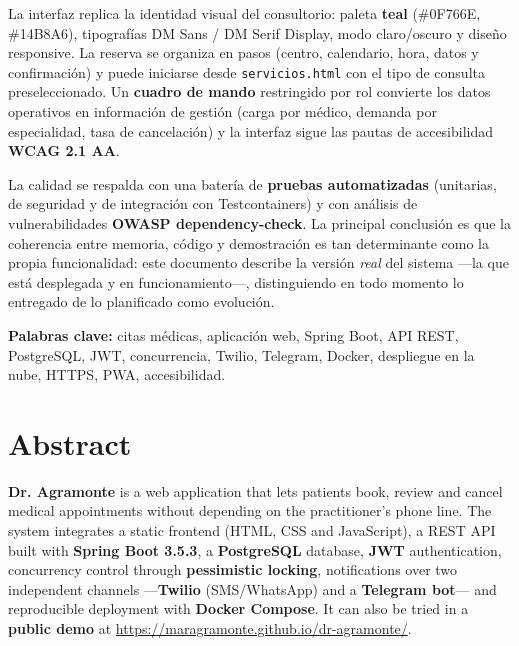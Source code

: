 \documentclass[12pt,a4paper]{report}
\begin{document}
La interfaz replica la identidad visual del consultorio: paleta \textbf{teal} (\#0F766E, \#14B8A6), tipografías DM Sans / DM Serif Display, modo claro/oscuro y diseño responsive. La reserva se organiza en pasos (centro, calendario, hora, datos y confirmación) y puede iniciarse desde \texttt{servicios.html} con el tipo de consulta preseleccionado. Un \textbf{cuadro de mando} restringido por rol convierte los datos operativos en información de gestión (carga por médico, demanda por especialidad, tasa de cancelación) y la interfaz sigue las pautas de accesibilidad \textbf{WCAG 2.1 AA}.

La calidad se respalda con una batería de \textbf{pruebas automatizadas} (unitarias, de seguridad y de integración con Testcontainers) y con análisis de vulnerabilidades \textbf{OWASP dependency-check}. La principal conclusión es que la coherencia entre memoria, código y demostración es tan determinante como la propia funcionalidad: este documento describe la versión \emph{real} del sistema —la que está desplegada y en funcionamiento—, distinguiendo en todo momento lo entregado de lo planificado como evolución.

\vspace{0.5em}
\noindent\textbf{Palabras clave:} citas médicas, aplicación web, Spring Boot, API REST, PostgreSQL, JWT, concurrencia, Twilio, Telegram, Docker, despliegue en la nube, HTTPS, PWA, accesibilidad.

\chapter*{Abstract}

\textbf{Dr. Agramonte} is a web application that lets patients book, review and cancel medical appointments without depending on the practitioner's phone line. The system integrates a static frontend (HTML, CSS and JavaScript), a REST API built with \textbf{Spring Boot 3.5.3}, a \textbf{PostgreSQL} database, \textbf{JWT} authentication, concurrency control through \textbf{pessimistic locking}, notifications over two independent channels —\textbf{Twilio} (SMS/WhatsApp) and a \textbf{Telegram bot}— and reproducible deployment with \textbf{Docker Compose}. It can also be tried in a \textbf{public demo} at \url{https://maragramonte.github.io/dr-agramonte/}.
\end{document}

